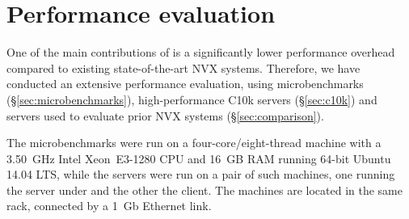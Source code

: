 \section{Performance evaluation}
\label{sec:evaluation}

One of the main contributions of \varan is a significantly lower
performance overhead compared to existing state-of-the-art NVX
systems.  Therefore, we have conducted an extensive performance
evaluation, using microbenchmarks (\S\ref{sec:microbenchmarks}),
high-performance C10k servers (\S\ref{sec:c10k}) and servers used to
evaluate prior NVX systems (\S\ref{sec:comparison}).

The microbenchmarks were run on a four-core/eight-thread machine with
a 3.50~GHz Intel Xeon~E3-1280 CPU and 16~GB RAM running 64-bit Ubuntu
14.04 LTS, while the servers were run on a pair of such machines, one
running the server under \varan and the other the client.  The machines
are located in the same rack, connected by a 1~Gb Ethernet link.





